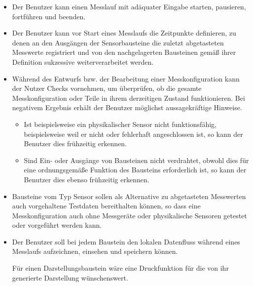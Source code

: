 \documentclass[parskip=full]{scrartcl}
\begin{document}
\begin{itemize}
	
	\item 
	\begin{MussKrit} 			
		Der Benutzer kann einen Messlauf mit adäquater Eingabe starten, pausieren, fortführen und beenden. 
	\end{MussKrit}
	
	\item 
	\begin{MussKrit} 	
		Der Benutzer kann vor Start eines Messlaufs die Zeitpunkte definieren, zu denen an den Ausgängen der Sensorbausteine die zuletzt abgetasteten Messwerte registriert und von den nachgelagerten Bausteinen gemäß ihrer Definition sukzessive weiterverarbeitet werden.		
	\end{MussKrit}
	
	\item 
	\begin{SollKrit} 
		Während des Entwurfs bzw. der Bearbeitung einer Messkonfiguration kann der Nutzer Checks vornehmen, um überprüfen, ob die gesamte Messkonfiguration oder Teile in ihrem derzeitigen Zustand funktionieren. Bei negativem Ergebnis erhält der Benutzer möglichst aussagekräftige Hinweise. 
 
	
		\begin{itemize}
			
			\item Ist beispielsweise ein physikalischer Sensor nicht funktionsfähig, beispielsweise weil er nicht oder fehlerhaft angeschlossen ist, so kann der Benutzer dies frühzeitig erkennen.
			
			\item Sind Ein- oder Ausgänge von Bausteinen nicht verdrahtet, obwohl dies für  eine ordnungsgemäße Funktion des Bausteins erforderlich ist, so kann der Benutzer dies ebenso frühzeitig erkennen.
			
		\end{itemize}
	\end{SollKrit}
	
	
	\item 
	\begin{WunschKrit} 			
		Bausteine vom Typ Sensor sollen als Alternative zu abgetasteten Messwerten auch vorgehaltene Testdaten bereithalten können, so dass eine Messkonfiguration auch ohne Messgeräte oder physikalische Sensoren getestet oder vorgeführt werden kann.
	\end{WunschKrit}	
	
	\item 
	\begin{WunschKrit} 			
		Der Benutzer soll bei jedem Baustein den lokalen Datenfluss während eines Messlaufs aufzeichnen, einsehen und speichern können. 
	\end{WunschKrit}
		
	\begin{WunschKrit} 
		Für einen Darstellungsbaustein wäre eine Druckfunktion für die von ihr generierte Darstellung wünschenswert. 
	\end{WunschKrit}
	
	
\end{itemize}
\end{document}
